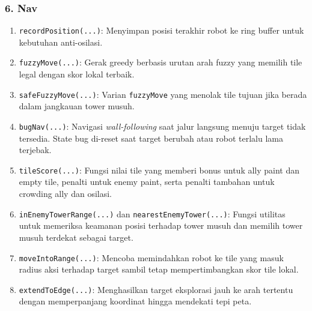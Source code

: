 \subsubsection{6. Nav}
\begin{enumerate}
	\item \texttt{recordPosition(...)}:
	      Menyimpan posisi terakhir robot ke ring buffer untuk kebutuhan anti-osilasi.

	\item \texttt{fuzzyMove(...)}:
	      Gerak greedy berbasis urutan arah fuzzy yang memilih tile legal dengan skor lokal terbaik.

	\item \texttt{safeFuzzyMove(...)}:
	      Varian \texttt{fuzzyMove} yang menolak tile tujuan jika berada dalam jangkauan tower musuh.

	\item \texttt{bugNav(...)}:
	      Navigasi \textit{wall-following} saat jalur langsung menuju target tidak tersedia. State bug di-reset saat target berubah atau robot terlalu lama terjebak.

	\item \texttt{tileScore(...)}:
	      Fungsi nilai tile yang memberi bonus untuk ally paint dan empty tile, penalti untuk enemy paint, serta penalti tambahan untuk crowding ally dan osilasi.

	\item \texttt{inEnemyTowerRange(...)} dan \texttt{nearestEnemyTower(...)}:
	      Fungsi utilitas untuk memeriksa keamanan posisi terhadap tower musuh dan memilih tower musuh terdekat sebagai target.

	\item \texttt{moveIntoRange(...)}:
	      Mencoba memindahkan robot ke tile yang masuk radius aksi terhadap target sambil tetap mempertimbangkan skor tile lokal.

	\item \texttt{extendToEdge(...)}:
	      Menghasilkan target eksplorasi jauh ke arah tertentu dengan memperpanjang koordinat hingga mendekati tepi peta.
\end{enumerate}

